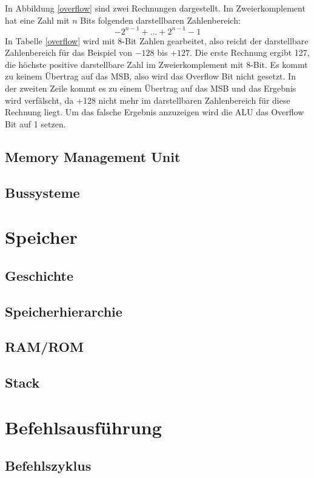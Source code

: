 \documentclass[12pt]{article}
\begin{document}
In Abbildung \ref{overflow} sind zwei Rechnungen dargestellt. Im Zweierkomplement hat eine Zahl mit $n$ Bits folgenden darstellbaren Zahlenbereich: 
$${-2}^{n-1}+ ... +2^{n-1}-1$$
In Tabelle \ref{overflow} wird mit 8-Bit Zahlen gearbeitet, also reicht der darstellbare Zahlenbereich für das Beispiel von $-128$ bis $+127$. Die erste Rechnung ergibt 127, die höchste positive darstellbare Zahl im Zweierkomplement mit 8-Bit. Es kommt zu keinem Übertrag auf das MSB, also wird das Overflow Bit nicht gesetzt. In der zweiten Zeile kommt es zu einem Übertrag auf das MSB und das Ergebnis wird verfälscht, da +128 nicht mehr im darstellbaren Zahlenbereich für diese Rechnung liegt. Um das falsche Ergebnis anzuzeigen wird die ALU das Overflow Bit auf 1 setzen. 


\subsection{Memory Management Unit}

\subsection{Bussysteme}

\section{Speicher}
\subsection{Geschichte}
\subsection{Speicherhierarchie}
\subsection{RAM/ROM}
\subsection{Stack}

\section{Befehlsausführung}
\subsection{Befehlszyklus}
\end{document}
